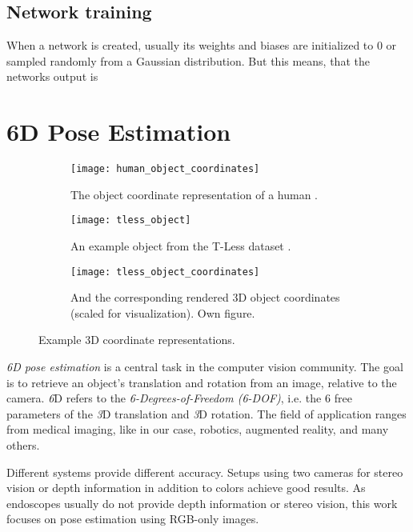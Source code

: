 \subsection{Network training} \label{section:network_training}

When a network is created, usually its weights and biases are initialized to 0 or sampled randomly from a Gaussian distribution. %
But this means, that the networks output is 


\section{6D Pose Estimation}

\begin{figure}[!tbp]
	\centering
	\begin{subfigure}[t]{0.3\textwidth}
		\centering
    	\texttt{[image: human\_object\_coordinates]}
    	\caption{The object coordinate representation of a human  \cite{tsharp}.}
    	\label{fig:human_object_coordinates}
	\end{subfigure}
	\begin{subfigure}[t]{0.3\textwidth}
		\centering
    	\texttt{[image: tless\_object]}
    	\caption{An example object from the T-Less dataset \cite{tless}.}
    	\label{fig:tless_object}
	\end{subfigure}
	\begin{subfigure}[t]{0.3\textwidth}
		\centering
    	\texttt{[image: tless\_object\_coordinates]}
    	\caption{And the corresponding rendered 3D object coordinates (scaled for visualization). Own figure.}
    	\label{fig:tless_object_coordinates}
	\end{subfigure}
	\caption{Example 3D coordinate representations.}
\end{figure} 

\textit{6D pose estimation} is a central task in the computer vision community. The goal is to retrieve an object's translation and rotation from an image, relative to the camera. \textit{6}D refers to the \textit{6-Degrees-of-Freedom (6-DOF)}, i.e. the 6 free parameters of the \textit{3}D translation and \textit{3}D rotation. The field of application ranges from medical imaging, like in our case, robotics, augmented reality, and many others. 

Different systems provide different accuracy. Setups using two cameras for stereo vision or depth information in addition to colors achieve good results. As endoscopes usually do not provide depth information or stereo vision, this work focuses on pose estimation using RGB-only images. 

